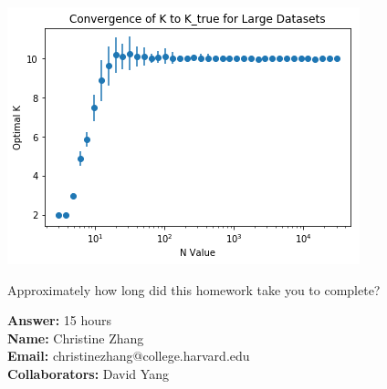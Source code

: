 \documentclass[submit]{harvardml}
\begin{document}
\begin{enumerate}[(a)]
\begin{center}
    \includegraphics[scale = .6]{K_converge.png}
\end{center}
\end{enumerate}




\newpage
\begin{problem}[Calibration, 1pt]
Approximately how long did this homework take you to complete?
\end{problem}
\textbf{Answer:} 15 hours \\
\textbf{Name:} Christine Zhang \\
\textbf{Email:} christinezhang@college.harvard.edu \\
\textbf{Collaborators:} David Yang
\end{document}

